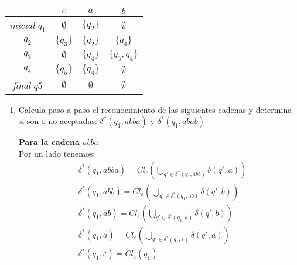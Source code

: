 \documentclass{article}
\begin{document}
\begin{enumerate}
\begin{center}
    \begin{tabular}{c|c c c}
        & $\varepsilon$ & $a$ & $b$ \\
        \hline
        \textit{inicial} $q_1$ & $\emptyset$ & $\{q_2\}$ & $\emptyset$ \\
        $q_2$ & $\{q_3\}$ & $\{q_2\}$ & $\{q_4\}$ \\
        $q_3$ & $\emptyset$ & $\{q_4\}$ & $\{q_3, q_4\}$ \\
        $q_4$ & $\{q_5\}$ & $\{q_4\}$ & $\emptyset$ \\
        \textit{final} $q5$ & $\emptyset$ & $\emptyset$ & $\emptyset$
    \end{tabular}
\end{center}

    \begin{enumerate}
    
        \item Calcula paso a paso el reconocimiento de las siguientes cadenas y determina si son o no aceptadas: $\delta^*(q_1, abba)$ y $\delta^*(q_1, abab)$
        
        \textbf{Para la cadena $abba$}\\
        Por un lado tenemos:
        \begin{align*}
        &\delta^*(q_1, abba) = Cl_{\varepsilon}(\bigcup_{q' \in \delta^*(q_1, abb)} \delta(q',a)) \\
        &\delta^*(q_1, abb) = Cl_{\varepsilon}(\bigcup_{q' \in \delta^*(q_1, ab)} \delta(q',b)) \\
        &\delta^*(q_1, ab) = Cl_{\varepsilon}(\bigcup_{q' \in \delta^*(q_1, a)} \delta(q',b)) \\
        &\delta^*(q_1, a) = Cl_{\varepsilon}(\bigcup_{q' \in \delta^*(q_1, \varepsilon)} \delta(q',a)) \\
        &\delta^*(q_1, \varepsilon) = Cl_{\varepsilon}(q_1) \\
        \end{align*}
        

\end{enumerate}
\end{enumerate}
\end{document}

